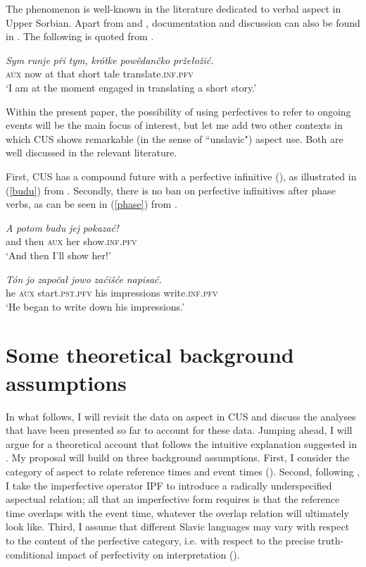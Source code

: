 \documentclass[output=paper,colorlinks,citecolor=brown]{langscibook}
\begin{document}
\noindent The phenomenon is well-known in the literature dedicated to verbal aspect in Upper Sorbian. Apart from \citet{Breu2000} and \citet{Scholze2008}, documentation and discussion can also be found in \citet{Werner2003, Werner2013}. The following is quoted from \citet[43]{Werner2003}.

\ea\label{usong2}
\gll \textit{Sym} \textit{runje} \textit{při} \textit{tym,} \textit{kr\'otke} \textit{powědan\v{c}ko}
\textit{prže\l{o}ži\'c.}\\
\textsc{aux} now at that short tale translate.\textsc{inf.pfv}\\
\glt \normalsize{`I am at the moment engaged in translating a short story.'}
\z

\noindent Within the present paper, the possibility of using perfectives to refer to ongoing events will be the main focus of interest, but let me add two other contexts in which CUS shows remarkable (in the sense of ``unslavic") aspect use.
Both are well discussed in the relevant literature. 

First, CUS has a compound future with a perfective infinitive (\citealt[637]{Stone1993}), as illustrated in (\ref{budu}) from \citet{Scholze2008}. Secondly, there is no ban on perfective infinitives after phase verbs, as can be seen in (\ref{phase}) from \citet{Breu2012}. 

\ea\label{budu}
\gll \textit{A} \textit{potom} \textit{budu} \textit{jej} \textit{pokaza\'c!}\\
and then \textsc{aux} her show.\textsc{inf.pfv}\\
\glt \normalsize{`And then I'll show her!'}
\z

\ea\label{phase}
\gll \textit{T\'on} \textit{jo} \textit{zapo\v{c}a\l{}} \textit{jowo} \textit{za\'ciš\'ce} \textit{napisa\'c.}\\
he \textsc{aux} start.\textsc{pst.pfv} his impressions write.\textsc{inf.pfv}\\
\glt \normalsize{`He began to write down his impressions.'}
\z



\section{Some theoretical background assumptions}\label{mueller:sec:background}
In what follows, I will revisit the data on aspect in CUS and 
discuss the analyses that have been presented so far to account for these data. Jumping ahead, I will argue for a theoretical account that follows the intuitive explanation suggested in \citet{Toops2001}. My proposal will build on three background assumptions. First, I consider the category of aspect to relate reference times and event times (\citealt{Klein1994}).  Second, following \citet{Gronn2004}, I take the imperfective operator 
IPF to introduce a radically underspecified aspectual relation; all that an imperfective form requires is that the reference time overlaps with the event time, whatever the overlap relation will ultimately look like. Third, I assume that different Slavic languages may vary with respect to the content of the perfective category, i.e. with respect to the precise truth-conditional impact of perfectivity on interpretation (\citealt{omr18}). 
\end{document}
